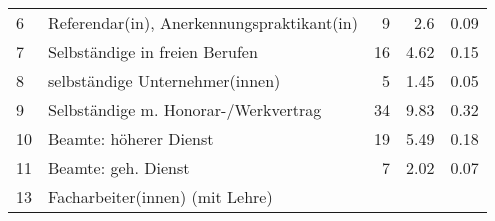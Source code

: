 \begin{longtable}{lXrrr}
     6 &
     \multicolumn{1}{X}{ Referendar(in), Anerkennungspraktikant(in)   } &


       \num{9} &
       \num[round-mode=places,round-precision=2]{2,6} &
         \num[round-mode=places,round-precision=2]{0,09} \\

     7 &
     \multicolumn{1}{X}{ Selbständige in freien Berufen   } &


       \num{16} &
       \num[round-mode=places,round-precision=2]{4,62} &
         \num[round-mode=places,round-precision=2]{0,15} \\

     8 &
     \multicolumn{1}{X}{ selbständige Unternehmer(innen)   } &


       \num{5} &
       \num[round-mode=places,round-precision=2]{1,45} &
         \num[round-mode=places,round-precision=2]{0,05} \\

     9 &
     \multicolumn{1}{X}{ Selbständige m. Honorar-/Werkvertrag   } &


       \num{34} &
       \num[round-mode=places,round-precision=2]{9,83} &
         \num[round-mode=places,round-precision=2]{0,32} \\

     10 &
     \multicolumn{1}{X}{ Beamte: höherer Dienst   } &


       \num{19} &
       \num[round-mode=places,round-precision=2]{5,49} &
         \num[round-mode=places,round-precision=2]{0,18} \\

     11 &
     \multicolumn{1}{X}{ Beamte: geh. Dienst   } &


       \num{7} &
       \num[round-mode=places,round-precision=2]{2,02} &
         \num[round-mode=places,round-precision=2]{0,07} \\

     13 &
     \multicolumn{1}{X}{ Facharbeiter(innen) (mit Lehre)   } &



\end{longtable}
